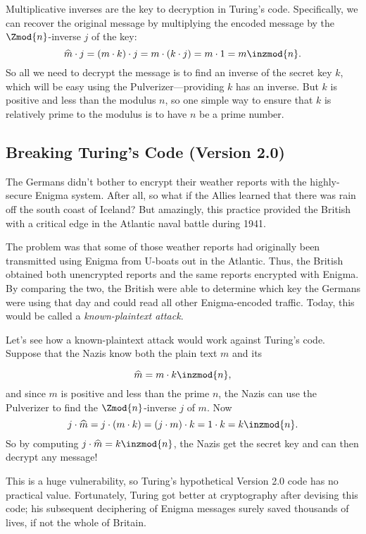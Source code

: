 Multiplicative inverses are the key to decryption in Turing's code.
Specifically, we can recover the original message by multiplying the
encoded message by the $\Zmod{n}$-inverse $j$ of the key:
\[
\widehat{m} \cdot j = (m \cdot k) \cdot j = m \cdot (k \cdot j) = m \cdot 1 = m \inzmod{n}.
\]
So all we need to decrypt the message is to find an inverse of the
secret key $k$, which will be easy using the Pulverizer---providing
$k$ has an inverse.  But $k$ is positive and less than the modulus
$n$, so one simple way to ensure that $k$ is relatively prime to the
modulus is to have $n$ be a prime number.

\subsection{Breaking Turing's Code (Version 2.0)}

The Germans didn't bother to encrypt their weather reports with the
highly-secure Enigma system.  After all, so what if the Allies learned
that there was rain off the south coast of Iceland?  But amazingly,
this practice provided the British with a critical edge in the
Atlantic naval battle during 1941.

The problem was that some of those weather reports had originally been
transmitted using Enigma from U-boats out in the Atlantic.  Thus, the
British obtained both unencrypted reports and the same reports
encrypted with Enigma.  By comparing the two, the British were able to
determine which key the Germans were using that day and could read all
other Enigma-encoded traffic.  Today, this would be called a
\emph{known-plaintext attack}.

Let's see how a known-plaintext attack would work against Turing's
code.  Suppose that the Nazis know both the plain text $m$ and its

\[
\widehat{m} = m \cdot k \inzmod{n},
\]
and since $m$ is positive and less than the prime $n$, the Nazis can
use the Pulverizer to find the $\Zmod{n}$-inverse $j$ of $m$.  Now
\[
j \cdot \widehat{m} = j \cdot (m \cdot k) = (j \cdot m) \cdot k
= 1 \cdot k = k \inzmod{n}.
\]
So by computing $j \cdot \widehat{m} = k \inzmod{n}$, the Nazis get the
secret key and can then decrypt any message!

This is a huge vulnerability, so Turing's hypothetical Version 2.0
code has no practical value.  Fortunately, Turing got better at
cryptography after devising this code; his subsequent deciphering of
Enigma messages surely saved thousands of lives, if not the whole of
Britain.

